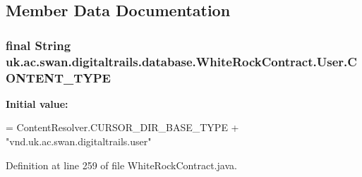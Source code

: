 \subsection{Member Data Documentation}
\hypertarget{classuk_1_1ac_1_1swan_1_1digitaltrails_1_1database_1_1_white_rock_contract_1_1_user_a9baf3520bdfb3aac95416344854d722e}{
\subsubsection[{C\+O\+N\+T\+E\+N\+T\+\_\+\+T\+Y\+P\+E}]{\setlength{\rightskip}{0pt plus 5cm}final String uk.\+ac.\+swan.\+digitaltrails.\+database.\+White\+Rock\+Contract.\+User.\+C\+O\+N\+T\+E\+N\+T\+\_\+\+T\+Y\+P\+E\hspace{0.3cm}{\ttfamily [static]}}}\label{classuk_1_1ac_1_1swan_1_1digitaltrails_1_1database_1_1_white_rock_contract_1_1_user_a9baf3520bdfb3aac95416344854d722e}
{\bfseries Initial value\+:}
\begin{DoxyCode}
= ContentResolver.CURSOR\_DIR\_BASE\_TYPE +
                \textcolor{stringliteral}{"vnd.uk.ac.swan.digitaltrails.user"}
\end{DoxyCode}


Definition at line 259 of file White\+Rock\+Contract.\+java.

